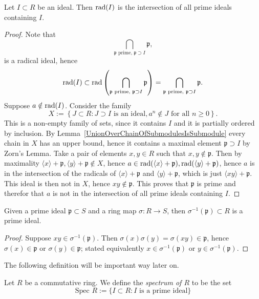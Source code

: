 \begin{lemma}\label{RadicalOfIdealIsIntersectionOfAllPrimeIdealsContainingIt}
    Let $I\subset R$ be an ideal. Then $\mathrm{rad}(I)$ is the intersection of all prime ideals containing $I$. 
\end{lemma}
\begin{proof}
    Note that  
    $$\bigcap_{\mathfrak{p} \text{ prime, } \mathfrak{p}\supset I} \mathfrak{p},$$
    is a radical ideal, hence 
    $$\mathrm{rad}(I) \subset \mathrm{rad}\left(\bigcap_{\mathfrak{p} \text{ prime, } \mathfrak{p}\supset I} \mathfrak{p}\right) = \bigcap_{\mathfrak{p} \text{ prime, } \mathfrak{p}\supset I} \mathfrak{p}. $$  
    Suppose $a\notin \mathrm{rad}(I)$. Consider the family
    $$
        X := \left\{ J \subset R : J\supset I \text{ is an ideal}, a^n \notin J \text{ for all } n\geq 0\right\}. 
    $$
    This is a non-empty family of sets, since it contains $I$ and it is partially ordered by inclusion. By Lemma~\ref{UnionOverChainOfSubmodulesIsSubmodule} every chain in $X$ has an upper bound, hence it contains a maximal element $\mathfrak{p}\supset I$ by Zorn's Lemma. Take a pair of elements $x,y\in R$ such that $x,y\notin \mathfrak{p}$. Then by maximality $\langle x\rangle +\mathfrak{p},\langle y\rangle +\mathfrak{p}\notin X$, hence $a\in \mathrm{rad}(\langle x\rangle +\mathfrak{p}), \mathrm{rad}(\langle y\rangle +\mathfrak{p})$, hence $a$ is in the intersection of the radicals of $\langle x\rangle + \mathfrak{p}$ and $\langle y\rangle +\mathfrak{p}$, which is just $\langle xy\rangle + \mathfrak{p}$. This ideal is then not in $X$, hence $xy\notin \mathfrak{p}$. This proves that $\mathfrak{p}$ is prime and therefor that $a$ is not in the intersection of all prime ideals containing $I$.   
\end{proof}
\begin{proposition}\label{PreImageOfPrimeIdealUnderRingMapIsPrime}
    Given a prime ideal $\mathfrak{p}\subset S$ and a ring map $\sigma : R\rightarrow S$, then $\sigma^{-1}(\mathfrak{p})\subset R$ is a prime ideal.
\end{proposition}
\begin{proof}
    Suppose $xy\in\sigma^{-1}(\mathfrak{p})$. Then $\sigma(x)\sigma(y)=\sigma(xy)\in \mathfrak{p}$, hence $\sigma(x)\in \mathfrak{p}$ or $\sigma(y)\in\mathfrak{p}$; stated equivalently $x\in \sigma^{-1}(\mathfrak{p})$ or $y\in \sigma^{-1}(\mathfrak{p})$.   
\end{proof}
The following definition will be important way later on. 
\begin{definition}
    Let $R$ be a commutative ring. We define the \textit{spectrum of $R$} to be the set 
    $$\text{Spec } R := \{ I \subset R : I \text{ is a prime ideal}\}$$
\end{definition}
